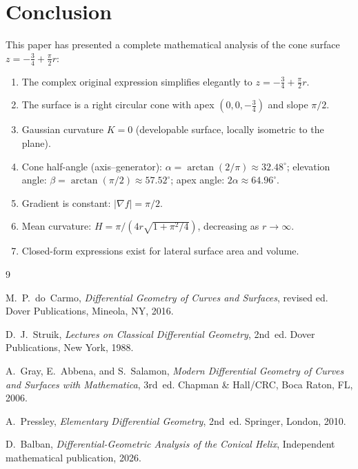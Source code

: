 \documentclass[12pt,a4paper]{article}
\theoremstyle{plain}
\theoremstyle{definition}
\theoremstyle{remark}
\begin{document}
\section{Conclusion}

This paper has presented a complete mathematical analysis of the cone surface
$z = -\tfrac{3}{4}+\tfrac{\pi}{2}r$:

\begin{enumerate}
\item The complex original expression simplifies elegantly to $z = -\tfrac{3}{4}+\tfrac{\pi}{2}r$.
\item The surface is a right circular cone with apex $(0,0,-\tfrac{3}{4})$ and slope $\pi/2$.
\item Gaussian curvature $K=0$ (developable surface, locally isometric to the plane).
\item Cone half-angle (axis--generator): $\alpha = \arctan(2/\pi)\approx 32.48^\circ$;
elevation angle: $\beta = \arctan(\pi/2)\approx 57.52^\circ$; apex angle: $2\alpha\approx 64.96^\circ$.
\item Gradient is constant: $|\nabla f| = \pi/2$.
\item Mean curvature: $H = \pi/(4r\sqrt{1+\pi^2/4})$, decreasing as $r\to\infty$.
\item Closed-form expressions exist for lateral surface area and volume.
\end{enumerate}


\begin{thebibliography}{9}

M.~P.~do~Carmo,
\textit{Differential Geometry of Curves and Surfaces}, revised ed.
Dover Publications, Mineola, NY, 2016.

D.~J.~Struik,
\textit{Lectures on Classical Differential Geometry}, 2nd~ed.
Dover Publications, New York, 1988.

A.~Gray, E.~Abbena, and S.~Salamon,
\textit{Modern Differential Geometry of Curves and Surfaces with Mathematica}, 3rd~ed.
Chapman \& Hall/CRC, Boca Raton, FL, 2006.

A.~Pressley,
\textit{Elementary Differential Geometry}, 2nd~ed.
Springer, London, 2010.

D.~Balban,
\textit{Differential-Geometric Analysis of the Conical Helix},
Independent mathematical publication, 2026.

\end{thebibliography}
\end{document}
